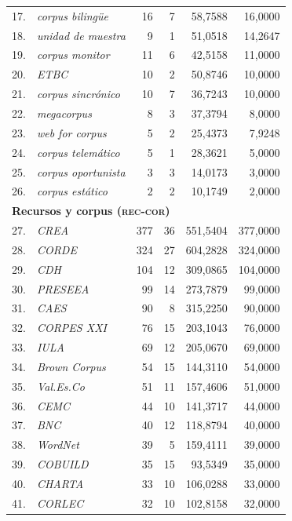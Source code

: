 \begin{longtable}{@{} r p{5cm} r r r r @{}}
17. & \textit{corpus bilingüe} & 16 & 7 & 58{,}7588 & 16{,}0000 \\
18. & \textit{unidad de muestra} & 9 & 1 & 51{,}0518 & 14{,}2647 \\
19. & \textit{corpus monitor} & 11 & 6 & 42{,}5158 & 11{,}0000 \\
20. & \textit{ETBC} & 10 & 2 & 50{,}8746 & 10{,}0000 \\
21. & \textit{corpus sincrónico} & 10 & 7 & 36{,}7243 & 10{,}0000 \\
22. & \textit{megacorpus} & 8 & 3 & 37{,}3794 & 8{,}0000 \\
23. & \textit{web for corpus} & 5 & 2 & 25{,}4373 & 7{,}9248 \\
24. & \textit{corpus telemático} & 5 & 1 & 28{,}3621 & 5{,}0000 \\
25. & \textit{corpus oportunista} & 3 & 3 & 14{,}0173 & 3{,}0000 \\
26. & \textit{corpus estático} & 2 & 2 & 10{,}1749 & 2{,}0000 \\
\midrule
\multicolumn{6}{l}{\textbf{Recursos y corpus (\textsc{rec-cor})}} \\
\midrule
27. & \textit{CREA} & 377 & 36 & 551{,}5404 & 377{,}0000 \\
28. & \textit{CORDE} & 324 & 27 & 604{,}2828 & 324{,}0000 \\
29. & \textit{CDH} & 104 & 12 & 309{,}0865 & 104{,}0000 \\
30. & \textit{PRESEEA} & 99 & 14 & 273{,}7879 & 99{,}0000 \\
31. & \textit{CAES} & 90 & 8 & 315{,}2250 & 90{,}0000 \\
32. & \textit{CORPES XXI} & 76 & 15 & 203{,}1043 & 76{,}0000 \\
33. & \textit{IULA} & 69 & 12 & 205{,}0670 & 69{,}0000 \\
34. & \textit{Brown Corpus} & 54 & 15 & 144{,}3110 & 54{,}0000 \\
35. & \textit{Val.Es.Co} & 51 & 11 & 157{,}4606 & 51{,}0000 \\
36. & \textit{CEMC} & 44 & 10 & 141{,}3717 & 44{,}0000 \\
37. & \textit{BNC} & 40 & 12 & 118{,}8794 & 40{,}0000 \\
38. & \textit{WordNet} & 39 & 5 & 159{,}4111 & 39{,}0000 \\
39. & \textit{COBUILD} & 35 & 15 & 93{,}5349 & 35{,}0000 \\
40. & \textit{CHARTA} & 33 & 10 & 106{,}0288 & 33{,}0000 \\
41. & \textit{CORLEC} & 32 & 10 & 102{,}8158 & 32{,}0000 \\

\end{longtable}
